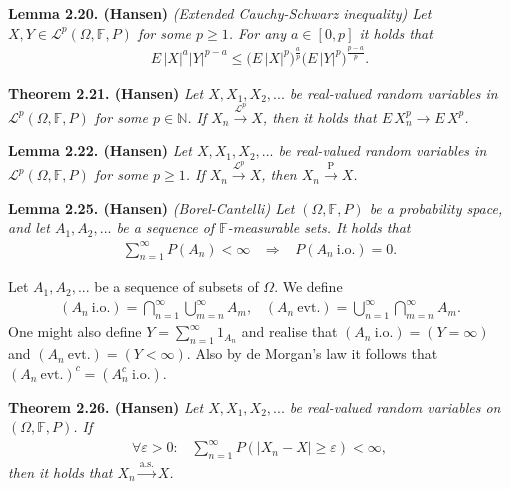 \documentclass[a4paper,12pt,openany]{book}
\begin{document}
\textbf{Lemma 2.20. (Hansen)} \emph{(Extended Cauchy-Schwarz inequality) Let \(X,Y\in\mathcal{L}^p(\Omega,\mathbb{F},P)\) for some \(p\ge 1\). For any \(a\in[0,p]\) it holds that}
\begin{align*}
    E\, \vert X\vert^a\vert Y\vert^{p-a}\le \Big(E\, \vert X\vert^p\Big)^{\frac{a}{p}}\Big(E\, \vert Y\vert^p\Big)^{\frac{p-a}{p}}.\tag{2.29}
\end{align*}

\textbf{Theorem 2.21. (Hansen)} \emph{Let \(X,X_1,X_2,...\) be real-valued random variables in \(\mathcal{L}^p(\Omega,\mathbb{F},P)\) for some \(p\in\mathbb{N}\). If \(X_n\stackrel{\mathcal{L}^p}{\to} X\), then it holds that \(E\, X_n^p\to E\, X^p\).}

\textbf{Lemma 2.22. (Hansen)} \emph{Let \(X,X_1,X_2,...\) be real-valued random variables in \(\mathcal{L}^p(\Omega,\mathbb{F},P)\) for some \(p\ge 1\). If \(X_n\stackrel{\mathcal{L}^p}{\to} X\), then \(X_n\stackrel{\text{P}}{\to} X\).}

\textbf{Lemma 2.25. (Hansen)} \emph{(Borel-Cantelli) Let \((\Omega,\mathbb{F},P)\) be a probability space, and let \(A_1,A_2,...\) be a sequence of \(\mathbb{F}\)-measurable sets. It holds that}
\begin{align*}
    \sum_{n=1}^\infty P(A_n)<\infty\hspace{10pt}\Rightarrow\hspace{10pt}P(A_n\ \text{i.o.})=0.
\end{align*}

Let \(A_1,A_2,...\) be a sequence of subsets of \(\Omega\). We define
\begin{align*}
    (A_n\ \text{i.o.})=\bigcap_{n=1}^\infty\bigcup_{m=n}^\infty A_m,\hspace{10pt}(A_n\ \text{evt.})=\bigcup_{n=1}^\infty\bigcap_{m=n}^\infty A_m.
\end{align*}
One might also define \(Y=\sum_{n=1}^\infty 1_{A_n}\) and realise that \((A_n\ \text{i.o.})=(Y=\infty)\) and \((A_n\ \text{evt.})=(Y<\infty)\). Also by de Morgan's law it follows that \((A_n\ \text{evt.})^c=(A_n^c\ \text{i.o.})\).

\textbf{Theorem 2.26. (Hansen)} \emph{Let \(X,X_1,X_2,...\) be real-valued random variables on \((\Omega,\mathbb{F},P)\). If}
\begin{align*}
    \forall \varepsilon>0:\hspace{10pt}\sum_{n=1}^\infty P(\vert X_n-X\vert \ge \varepsilon)<\infty,\tag{2.32}
\end{align*}
\emph{then it holds that \(X_n\stackrel{\text{a.s.}}{\to} X\).}
\end{document}

